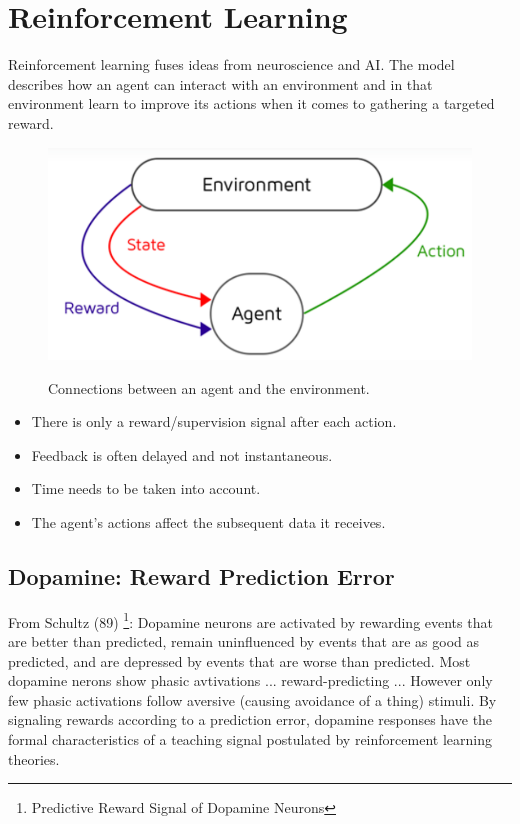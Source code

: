 \documentclass[main]{subfiles}
\begin{document}
\newpage
\section{Reinforcement Learning}
 Reinforcement learning fuses ideas from neuroscience and AI. The model describes how an agent can interact with an environment and in that environment learn to improve its actions when it comes to gathering a targeted reward. 
 
 
  \begin{figure}[H]
	\centering
	\includegraphics[width=0.9\linewidth]{08_ReinforcementLearning/figures/rl-env-agent-1.png}
	\label{fig:rl-env-agent-1}
	\caption{Connections between an agent and the environment.}
\end{figure}

\begin{itemize}
    \item There is only a reward/supervision signal after each action.
    \item Feedback is often delayed and not instantaneous.
    \item Time needs to be taken into account.
    \item The agent’s actions affect the subsequent data it receives.
\end{itemize}



 \subsection{Dopamine: Reward Prediction Error}
From Schultz (89) \footnote{Predictive Reward Signal of Dopamine Neurons}: Dopamine neurons are activated by rewarding events that are better than predicted, remain uninfluenced by events that are as good as predicted, and are depressed by events that are worse than predicted. Most dopamine nerons show phasic avtivations ... reward-predicting ... However only few phasic activations follow aversive (causing avoidance of a thing) stimuli. By signaling rewards  according to a prediction error, dopamine responses have the formal characteristics of a teaching signal postulated by reinforcement learning theories.
 
\end{document}
